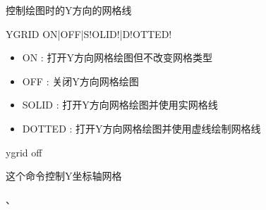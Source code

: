 \label{cmd:ygrid}

控制绘图时的Y方向的网格线

\begin{SACSTX}
YGRID ON|OFF|S!OLID!|D!OTTED!
\end{SACSTX}

\begin{itemize}
\item ON : 打开Y方向网格绘图但不改变网格类型 
\item OFF : 关闭Y方向网格绘图 
\item SOLID : 打开Y方向网格绘图并使用实网格线 
\item DOTTED : 打开Y方向网格绘图并使用虚线绘制网格线 
\end{itemize}

\begin{SACDFT}
ygrid off
\end{SACDFT}

这个命令控制Y坐标轴网格

、
